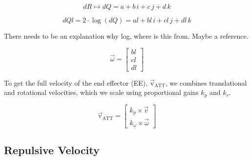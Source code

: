 \documentclass[]{article}
\begin{document}
\begin{equation}
	dR \mapsto dQ = a + b \, i + c \, j + d \, k
	\label{eq: quat_mapsto}
\end{equation}

\begin{equation}
	dQl = 2 \cdot \log(dQ) = al + bl \, i + cl \, j + dl \, k
	\label{eq:quat_log}
\end{equation}

\alert{There needs to be an explanation why log, where is this from. Maybe a reference.}



\begin{equation}
	\vec{\omega} =
	\begin{bmatrix}
		bl \\
		cl \\
		dl
	\end{bmatrix}
	\label{eq:rot_error_vector}
\end{equation}

To get the full velocity of the end effector (EE), \( \mathrm{\vec{v}_{ATT}} \), we combines translational and rotational velocities, which we scale using proportional gains \( k_p \) and \( k_r \).

\begin{equation}
	\mathrm{\vec{v}_{ATT}} = 
	\begin{bmatrix}
		k_p \times \vec{v}   \\
		k_{\omega} \times \vec{\omega}
	\end{bmatrix}
	\label{eq:ee_velocity}
\end{equation}

\subsection{Repulsive Velocity}
\label{chap:repulsive velocity}
\end{document}
